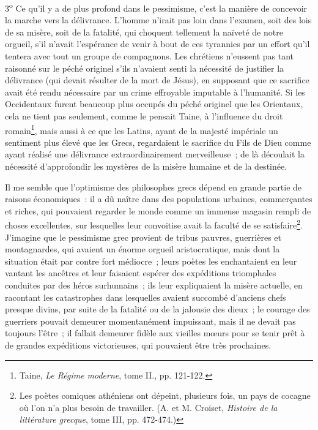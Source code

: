 \documentclass[french,twoside]{book} %
\begin{document}
3\textsuperscript{o} Ce qu’il y a de plus profond dans le pessimisme, c’est la manière de concevoir la marche vers la délivrance. L’homme n’irait pas loin dans l’examen, soit des lois de sa misère, soit de la fatalité, qui choquent tellement la naïveté de notre orgueil, s’il n’avait l’espérance de venir à bout de ces tyrannies par un effort qu’il tentera avec tout un groupe de compagnons. Les chrétiens n’eussent pas tant raisonné sur le péché originel s’ils n’avaient senti la nécessité de justifier la délivrance (qui devait résulter de la mort de Jésus), en supposant que ce sacrifice avait été rendu nécessaire par un crime effroyable imputable à l’humanité. Si les Occidentaux furent beaucoup plus occupés du péché originel que les Orientaux, cela ne tient pas seulement, comme le pensait Taine, à l’influence du droit romain\footnote{ \noindent Taine, \emph{Le Régime moderne}, tome II., pp. 121-122.
 }, mais aussi à ce que les Latins, ayant de la majesté impériale un sentiment plus élevé que les Grecs, regardaient le sacrifice du Fils de Dieu comme ayant réalisé une délivrance extraordinairement merveilleuse ; de là découlait la nécessité d’approfondir les mystères de la misère humaine et de la destinée.\par
Il me semble que l’optimisme des philosophes grecs dépend en grande partie de raisons économiques : il a  dû naître dans des populations urbaines, commerçantes et riches, qui pouvaient regarder le monde comme un immense magasin rempli de choses excellentes, sur lesquelles leur convoitise avait la faculté de se satisfaire\footnote{ \noindent Les poètes comiques athéniens ont dépeint, plusieurs fois, un pays de cocagne où l’on n’a plus besoin de travailler. (A. et M. Croiset, \emph{Histoire de la littérature grecque}, tome III, pp. 472-474.)
 }. J’imagine que le pessimisme grec provient de tribus pauvres, guerrières et montagnardes, qui avaient un énorme orgueil aristocratique, mais dont la situation était par contre fort médiocre ; leurs poètes les enchantaient en leur vantant les ancêtres et leur faisaient espérer des expéditions triomphales conduites par des héros surhumains ; ils leur expliquaient la misère actuelle, en racontant les catastrophes dans lesquelles avaient succombé d’anciens chefs presque divins, par suite de la fatalité ou de la jalousie des dieux ; le courage des guerriers pouvait demeurer momentanément impuissant, mais il ne devait pas toujours l’être ; il fallait demeurer fidèle aux vieilles mœurs pour se tenir prêt à de grandes expéditions victorieuses, qui pouvaient être très prochaines.\par
\end{document}
